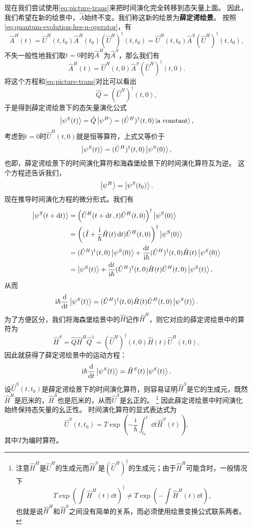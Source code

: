 \documentclass[hyperref, UTF8, a4paper]{ctexart}
\newcommand*{\ii}{\mathrm{i}}
\begin{document}
现在我们尝试使用\eqref{eq:picture-trans}来把时间演化完全转移到态矢量上面。
因此，我们希望在新的绘景中，$\hat{A}$始终不变。我们称这新的绘景为\textbf{薛定谔绘景}。
按照\eqref{eq:quantum-evolution-hes-u-operator}，有
\[
    \hat{A}^H(t) = \hat{U}^H(t, t_0) \hat{A}^H (t_0) (\hat{U}^H)^\dagger(t, t_0) = \hat{U}^H(t, t_0) \hat{A}^S( \hat{U}^H)^\dagger(t, t_0),
\]
不失一般性地我们取$t=0$时的$\hat{A}^H$为$\hat{A}^S$，那么我们有
\[
    \hat{A}^H (t) = \hat{U}^H(t, 0) \hat{A}^S( \hat{U}^H)^\dagger(t, 0).
\]
将这个方程和\eqref{eq:picture-trans}对比可以看出
\[
    \hat{Q} = (\hat{U}^H)^\dagger(t, 0),
\]
于是得到薛定谔绘景下的态矢量演化公式
\[
    \ket{\psi^S(t)} = \hat{Q} \ket{\psi^H} = (\hat{U}^H)^\dagger (t, 0) \ket{\text{a constant}},
\]
考虑到$t=0$时$\hat{U}^H (t, 0)$就是恒等算符，上式又等价于
\[
    \ket{\psi^S(t)} = (\hat{U}^H)^\dagger (t, 0) \ket{\psi^S (0)},
\]
也即，薛定谔绘景下的时间演化算符和海森堡绘景下的时间演化算符互为逆。
这个方程还告诉我们，
\[
    \ket{\psi^H} = \ket{\psi^S(t_0)}.
\]
现在推导时间演化方程的微分形式。我们有
\[
    \begin{aligned}
        \ket{\psi^S (t + \dd{t})} &= \left( \hat{U}^H (t + \dd{t}, t) \hat{U}^H (t, 0)  \right)^\dagger \ket{\psi^S(0)} \\
        &= \left( (\hat{I} + \frac{\ii}{\hbar} \hat{H}(t) \dd{t})   \hat{U}^H (t, 0) \right)^\dagger \ket{\psi^S (0)} \\
        &= (\hat{U}^H)^\dagger (t, 0) \ket{\psi^S (0)} + \frac{\dd{t}}{\ii \hbar} (\hat{U}^H)^\dagger (t, 0) \hat{H}(t) \ket{\psi^S (0)} \\
        &= \ket{\psi^S (t)} + \frac{\dd{t}}{\ii \hbar} (\hat{U}^H)^\dagger (t, 0) \hat{H}(t) \hat{U}^H (t, 0) \ket{\psi^S (t)},
    \end{aligned}
\]
从而
\[
    \ii \hbar \dv{t} \ket{\psi^S (t)} = (\hat{U}^H)^\dagger (t, 0) \hat{H}(t) \hat{U}^H (t, 0) \ket{\psi^S (t)}.
\]
为了方便区分，我们将海森堡绘景中的$\hat{H}$记作$\hat{H}^H$，则它对应的薛定谔绘景中的算符为
\[
    \hat{H}^S = \hat{Q} \hat{H}^H \hat{Q}^\dagger = (\hat{U}^H)^\dagger (t, 0) \hat{H}(t) \hat{U}^H (t, 0), 
\]
因此就获得了薛定谔绘景中的运动方程：
\begin{equation}
    \ii \hbar \dv{t} \ket{\psi^S(t)} = \hat{H}^S (t) \ket{\psi^S(t)}.
\end{equation}
设$\hat{U}^S(t, t_0)$是薛定谔绘景下的时间演化算符，则容易证明$\hat{H}^S$是它的生成元，既然$\hat{H}^H$是厄米的，$\hat{H}^S$也是厄米的，从而$\hat{U}^S$是幺正的。%
\footnote{注意$\hat{H}^H$是$\hat{U}^H$的生成元而$\hat{H}^S$是$(\hat{U}^H)^\dagger$的生成元；由于$\hat{H}^H$可能含时，一般情况下
\[
    T \exp(\int \hat{H}^H (t) \dd{t})^\dagger \neq T \exp(- \int \hat{H}^H (t) \dd{t}),
\]
也就是说$\hat{H}^H$和$\hat{H}^S$之间没有简单的关系，而必须使用绘景变换公式联系两者。
}
因此薛定谔绘景中时间演化始终保持态矢量的幺正性。
时间演化算符的显式表达式为
\begin{equation}
    \hat{U}^S(t, t_0) = T \exp \left( - \frac{\ii}{\hbar} \int_{t_0}^t \dd{t} \hat{H}^S(t) \right),
\end{equation}
其中$T$为编时算符。
\end{document}

